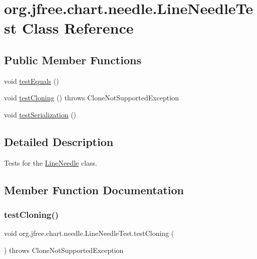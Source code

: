 \hypertarget{classorg_1_1jfree_1_1chart_1_1needle_1_1_line_needle_test}{}\section{org.\+jfree.\+chart.\+needle.\+Line\+Needle\+Test Class Reference}
\label{classorg_1_1jfree_1_1chart_1_1needle_1_1_line_needle_test}
\subsection*{Public Member Functions}
\begin{DoxyCompactItemize}
\item 
void \mbox{\hyperlink{classorg_1_1jfree_1_1chart_1_1needle_1_1_line_needle_test_ae53166193e62d8a4f6361dfe5c8140cd}{test\+Equals}} ()
\item 
void \mbox{\hyperlink{classorg_1_1jfree_1_1chart_1_1needle_1_1_line_needle_test_ab7d284c42fb63eece09ee7bb74f0586f}{test\+Cloning}} ()  throws Clone\+Not\+Supported\+Exception 
\item 
void \mbox{\hyperlink{classorg_1_1jfree_1_1chart_1_1needle_1_1_line_needle_test_a58cfc5fdea906cdb7be5531020ddd9d2}{test\+Serialization}} ()
\end{DoxyCompactItemize}


\subsection{Detailed Description}
Tests for the \mbox{\hyperlink{classorg_1_1jfree_1_1chart_1_1needle_1_1_line_needle}{Line\+Needle}} class. 

\subsection{Member Function Documentation}
\mbox{\label{classorg_1_1jfree_1_1chart_1_1needle_1_1_line_needle_test_ab7d284c42fb63eece09ee7bb74f0586f}} 
\subsubsection{\texorpdfstring{test\+Cloning()}{testCloning()}}
{\footnotesize\ttfamily void org.\+jfree.\+chart.\+needle.\+Line\+Needle\+Test.\+test\+Cloning (\begin{DoxyParamCaption}{ }\end{DoxyParamCaption}) throws Clone\+Not\+Supported\+Exception}

